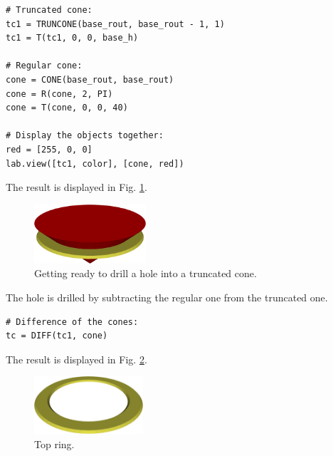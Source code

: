 {\small
\begin{bbox}
\begin{verbatim}
# Truncated cone:
tc1 = TRUNCONE(base_rout, base_rout - 1, 1)
tc1 = T(tc1, 0, 0, base_h)

# Regular cone:
cone = CONE(base_rout, base_rout)
cone = R(cone, 2, PI)
cone = T(cone, 0, 0, 40)

# Display the objects together:
red = [255, 0, 0]
lab.view([tc1, color], [cone, red])
\end{verbatim}
\end{bbox}
}
\vspace{6mm}

\noindent
The result is displayed in Fig. \ref{fig:gear-4}.\\

\begin{figure}[!ht]
\begin{center}
\includegraphics[width=0.37\textwidth]{img/gear-4.png}
\end{center}
\vspace{-4mm}
\caption{Getting ready to drill a hole into a truncated cone.}
\label{fig:gear-4}
\end{figure}
\noindent
\noindent
The hole is drilled by subtracting the regular one from the truncated one.\\

{\small
\begin{bbox}
\begin{verbatim}
# Difference of the cones:
tc = DIFF(tc1, cone)
\end{verbatim}
\end{bbox}
}
\vspace{6mm}

\noindent
The result is displayed in Fig. \ref{fig:gear-5}.

\begin{figure}[!ht]
\begin{center}
\includegraphics[width=0.36\textwidth]{img/gear-5.png}
\end{center}
\vspace{-4mm}
\caption{Top ring.}
\label{fig:gear-5}
\end{figure}


